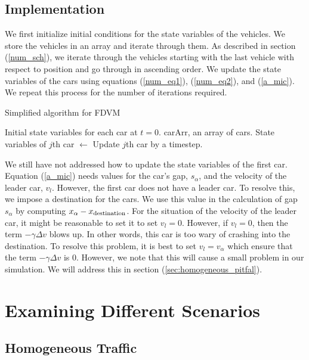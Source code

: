 \documentclass[12pt]{article}
\begin{document}
    \subsection{Implementation}\label{sec:implementation}
    We first initialize initial conditions for the state variables of the vehicles. We store the vehicles in an array and iterate through them. As described in section (\ref{num_sch}), we iterate through the vehicles starting with the last vehicle with respect to position and go through in ascending order. We update the state variables of the cars using equations (\ref{num_eq1}), (\ref{num_eq2}), and (\ref{a_mic}). We repeat this process for the number of iterations required. 
    \begin{algorithm}
      \caption{Simplified algorithm for FDVM}\label{alg:car-following}
      \begin{algorithmic}
      \Require Initial state variables for each car at $t=0$. 
      \Require carArr, an array of cars.
        \State State variables of $j$th car $\gets$ Update $j$th car by a timestep.
        \EndFor
      \EndFor
      \end{algorithmic}
      \end{algorithm}
    We still have not addressed how to update the state variables of the first car. Equation (\ref{a_mic}) needs values for the car's gap, $s_\alpha$, and the velocity of the leader car, $v_l$. However, the first car does not have a leader car. To resolve this, we impose a destination for the cars. We use this value in the calculation of gap $s_\alpha$ by computing $x_\alpha - x_{\rm destination}$. For the situation of the velocity of the leader car, it might be reasonable to set it to set $v_l = 0$. However, if $v_l=0$, then the term $-\gamma \Delta v$ blows up. In other words, this car is too wary of crashing into the destination. To resolve this problem, it is best to set $v_l = v_\alpha$ which ensure that the term $-\gamma \Delta v$ is $0$. However, we note that this will cause a small problem in our simulation. We will address this in section (\ref{sec:homogeneous_pitfal}). 
    
    
    \section{Examining Different Scenarios}
    \subsection{Homogeneous Traffic}\label{sec:homogeneous}
\end{document}
